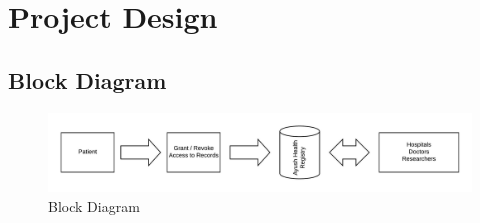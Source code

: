 \documentclass[11pt]{report}
\begin{document}
\chapter{Project Design}
\section{Block Diagram}
    \begin{figure}[h!]
        \centering
        \includegraphics[scale=0.8]{Block.jpeg}
        \caption{Block Diagram}
        \label{fig:my_label}
    \end{figure}
    \newpage
\end{document}

